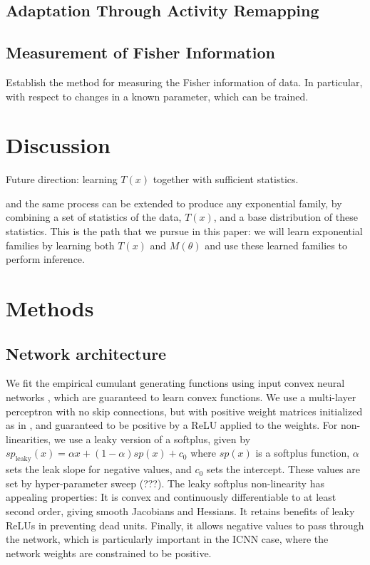 \documentclass[10pt]{article}      %
\begin{document}
\subsection{Adaptation Through Activity Remapping}






\subsection{Measurement of Fisher Information}

Establish the method for measuring the Fisher information of data. In particular, with respect to changes in a known parameter, which can be trained.




\section{Discussion}

Future direction: learning $T(x)$ together with sufficient statistics.


and the same process can be extended to produce any exponential family, by combining a set of statistics of the data, $T(x)$, and a base distribution of these statistics.
This is the path that we pursue in this paper: we will learn exponential families by learning both $T(x)$ and $M(\theta)$ and use these learned families to perform inference.



\section{Methods}
\subsection{Network architecture}

We fit the empirical cumulant generating functions using input convex neural networks \cite{amos_input_2017}, which are guaranteed to learn convex functions.
We use a multi-layer perceptron with no skip connections, but with positive weight matrices initialized as in \cite{hoedt_principled_2023}, and guaranteed to be positive by a ReLU applied to the weights.
For non-linearities, we use a leaky version of a softplus, given by $sp_{\textrm{leaky}}(x) = \alpha x + (1 - \alpha) sp(x) + c_0$ where $sp(x)$ is a softplus function, $\alpha$ sets the leak slope for negative values, and $c_0$ sets the intercept. 
These values are set by hyper-parameter sweep (???). 
The leaky softplus non-linearity has appealing properties:
It is convex and continuously differentiable to at least second order, giving smooth Jacobians and Hessians.
It retains benefits of leaky ReLUs in preventing dead units.
Finally, it allows negative values to pass through the network, which is particularly important in the ICNN case, where the network weights are constrained to be positive.
\end{document}
